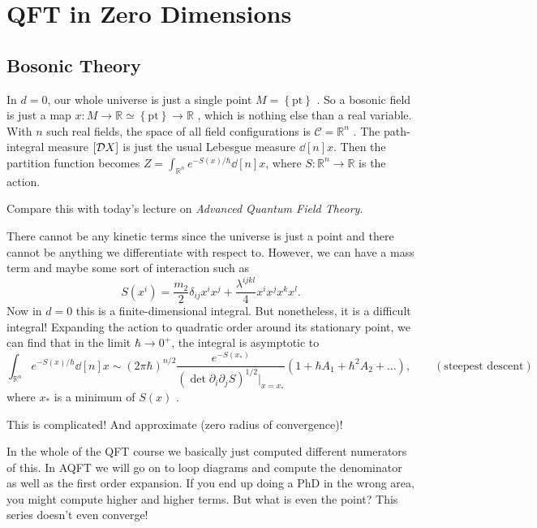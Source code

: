 \section{QFT in Zero Dimensions}%
\label{sec:qft_in_zero_dimensions}

\subsection{Bosonic Theory}%
\label{sub:bosonic_theory}

In $d = 0$, our whole universe is just a single point  $M = \left\{ \text{pt} \right\}$ . So a bosonic field is just a map $x \colon M \to \mathbb{R} \simeq \left\{ \text{pt} \right\} \to \mathbb{R}$ , which is nothing else than a real variable.
With $n$ such real fields, the space of all field configurations is $\mathcal{C} = \mathbb{R}^n$ .
The path-integral measure $[\mathop{\mathcal{D} X}]$  is just the usual Lebesgue measure $\dd[n]{x}$. 
Then the partition function becomes $Z = \int_{\mathbb{R}^n} e^{- {S}(x) / \hbar} \dd[n]{x}$, where $S \colon \mathbb{R}^n \to \mathbb{R}$ is the action.
\begin{leftbar}
  Compare this with today's lecture on \emph{Advanced Quantum Field Theory}.
\end{leftbar}

There cannot be any kinetic terms since the universe is just a point and there cannot be anything we differentiate with respect to.
However, we can have a mass term and maybe some sort of interaction such as
\begin{equation}
  S(x^{i}) = \frac{m_2}{2} \delta_{ij} x^{i} x^{j} + \frac{\lambda^{ijkl}}{4} x^{i} x^{j} x^{k} x^{l}.
\end{equation}
Now in $d = 0$ this is a finite-dimensional integral.
But nonetheless, it is a difficult integral! Expanding the action to quadratic order around its stationary point, we can find that in the limit  $\hbar \to 0^+$, the integral is asymptotic to
 \begin{equation}
   \int_{\mathbb{R}^n} e^{-S(x) / \hbar} \dd[n]{x} \sim (2 \pi \hbar)^{n / 2} \frac{e^{-S(x_*)}}{(\det \partial_{i} \partial_{j} S)^{1 / 2}\rvert_{x = x_*}}
   \left(  1 + \hbar A_1 + \hbar^2 A_2 + \dots \right), \qquad (\text{steepest descent})
\end{equation}
where $x_*$ is a minimum of  $S(x)$ .

This is complicated! And approximate (zero radius of convergence)! 
\begin{remark}
  In the whole of the QFT course we basically just computed different numerators of this.  In AQFT we will go on to loop diagrams and compute the denominator as well as the first order expansion.
  If you end up doing a PhD in the wrong area, you might compute higher and higher terms. But what is even the point? This series doesn't even converge!
\end{remark}

